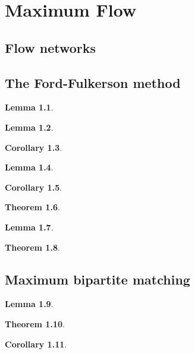 \documentclass[letter]{book}
\theoremstyle{definition}
\newtheorem{theorem}{Theorem}[chapter]
\newtheorem{lemma}[theorem]{Lemma}
\newtheorem{corollary}[theorem]{Corollary}
\theoremstyle{definition}
\theoremstyle{remark}
\begin{document}
\setcounter{chapter}{25}

\chapter{Maximum Flow}

\section{Flow networks}


\section{The Ford-Fulkerson method}
\begin{lemma}

\end{lemma}
\bigskip
\begin{lemma}

\end{lemma}
\bigskip
\begin{corollary}

\end{corollary}
\bigskip
\begin{lemma}

\end{lemma}
\bigskip
\begin{corollary}

\end{corollary}
\bigskip
\begin{theorem}

\end{theorem}
\bigskip
\begin{lemma}

\end{lemma}
\bigskip
\begin{theorem}

\end{theorem}


\section{Maximum bipartite matching}
\begin{lemma}

\end{lemma}
\bigskip
\begin{theorem}
\end{theorem}
\bigskip
\begin{corollary}

\end{corollary}
\end{document}
